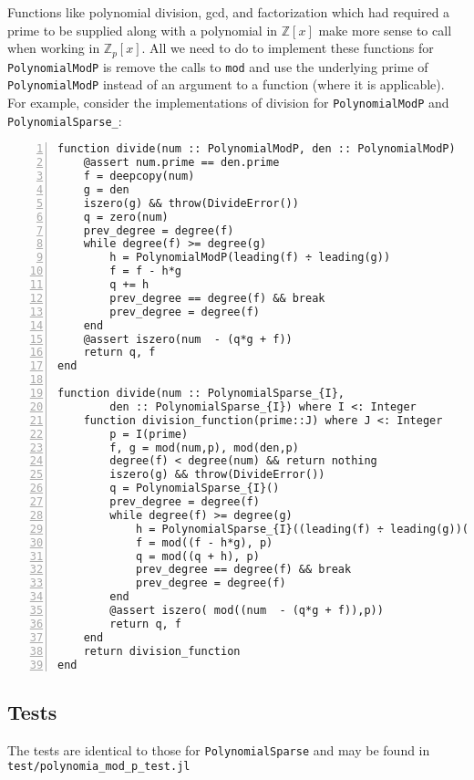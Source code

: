 \documentclass{article}
\theoremstyle{plain}
\numberwithin{theorem}{section}
\numberwithin{example}{section}
\theoremstyle{definition}
\numberwithin{definition}{section}
\begin{document}
Functions like polynomial division, gcd, and factorization which had required
a prime to be supplied along with a polynomial in $\mathbb{Z}[x]$ make more
sense to call when working in $\mathbb{Z}_p[x]$. All we need to do to implement
these functions for \texttt{PolynomialModP} is remove the calls to \texttt{mod}
and use the underlying prime of \texttt{PolynomialModP} instead of an argument
to a function (where  it is applicable). For example, consider the
implementations of division for \texttt{PolynomialModP} and
\texttt{PolynomialSparse\_}:

\begin{codebox}
    \begin{Verbatim}[numbers=left,xleftmargin=5mm]
function divide(num :: PolynomialModP, den :: PolynomialModP)
    @assert num.prime == den.prime
    f = deepcopy(num)
    g = den
    iszero(g) && throw(DivideError())
    q = zero(num)
    prev_degree = degree(f)
    while degree(f) >= degree(g) 
        h = PolynomialModP(leading(f) ÷ leading(g))
        f = f - h*g
        q += h
        prev_degree == degree(f) && break
        prev_degree = degree(f)
    end
    @assert iszero(num  - (q*g + f))
    return q, f
end

function divide(num :: PolynomialSparse_{I},
        den :: PolynomialSparse_{I}) where I <: Integer
    function division_function(prime::J) where J <: Integer
        p = I(prime)
        f, g = mod(num,p), mod(den,p)
        degree(f) < degree(num) && return nothing 
        iszero(g) && throw(DivideError())
        q = PolynomialSparse_{I}()
        prev_degree = degree(f)
        while degree(f) >= degree(g) 
            h = PolynomialSparse_{I}((leading(f) ÷ leading(g))(p))  #syzergy 
            f = mod((f - h*g), p)
            q = mod((q + h), p)
            prev_degree == degree(f) && break
            prev_degree = degree(f)
        end
        @assert iszero( mod((num  - (q*g + f)),p))
        return q, f
    end
    return division_function
end
    \end{Verbatim}
\end{codebox}

\bigbreak

\subsection{Tests}
The tests are identical to those for \texttt{PolynomialSparse} and may be found
in \texttt{test/polynomia\_mod\_p\_test.jl}
\end{document}
